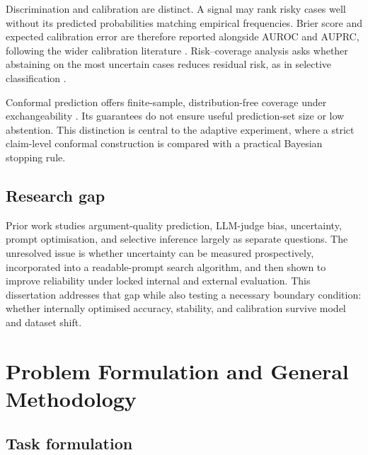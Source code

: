 \documentclass[11pt,twoside,a4paper]{report}
\begin{document}
Discrimination and calibration are distinct.  A signal may rank risky cases well
without its predicted probabilities matching empirical frequencies.  Brier score and
expected calibration error are therefore reported alongside AUROC and AUPRC,
following the wider calibration literature \cite{guo2017calibration}.  Risk--coverage
analysis asks whether abstaining on the most uncertain cases reduces residual risk,
as in selective classification \cite{geifman2017selective}.

Conformal prediction offers finite-sample, distribution-free coverage under
exchangeability \cite{angelopoulos2023conformal}.  Its guarantees do not ensure useful
prediction-set size or low abstention.  This distinction is central to the adaptive
experiment, where a strict claim-level conformal construction is compared with a
practical Bayesian stopping rule.

\section{Research gap}

Prior work studies argument-quality prediction, LLM-judge bias, uncertainty,
prompt optimisation, and selective inference largely as separate questions.  The
unresolved issue is whether uncertainty can be measured prospectively, incorporated
into a readable-prompt search algorithm, and then shown to improve reliability under
locked internal and external evaluation.  This dissertation addresses that gap while
also testing a necessary boundary condition: whether internally optimised accuracy,
stability, and calibration survive model and dataset shift.

\chapter{Problem Formulation and General Methodology}
\label{chap:methodology}

\section{Task formulation}
\end{document}
